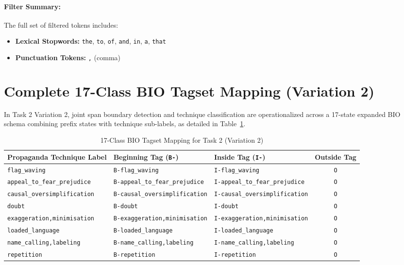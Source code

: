 \documentclass[12pt, a4paper]{article}
\begin{document}
\paragraph{Filter Summary:}
The full set of filtered tokens includes:
\begin{itemize}
    \item \textbf{Lexical Stopwords:} \texttt{the}, \texttt{to}, \texttt{of}, \texttt{and}, \texttt{in}, \texttt{a}, \texttt{that}
    \item \textbf{Punctuation Tokens:} \texttt{,} (comma)
\end{itemize}


\newpage
\section{Complete 17-Class BIO Tagset Mapping (Variation 2)}
\label{app:bio_tagset}

In Task 2 Variation 2, joint span boundary detection and technique classification are operationalized across a 17-state expanded BIO schema combining prefix states with technique sub-labels, as detailed in Table~\ref{tab:bio_tagset}.

\begin{table}[htbp]
  \centering
  \caption{17-Class BIO Tagset Mapping for Task 2 (Variation 2)}
  \label{tab:bio_tagset}
  \scriptsize                      %
  \setlength{\tabcolsep}{3pt}      %
  \begin{tabularx}{\textwidth}{l X X c}
    \toprule
    \textbf{Propaganda Technique Label} & \textbf{Beginning Tag (\texttt{B-})} & \textbf{Inside Tag (\texttt{I-})} & \textbf{Outside Tag} \\
    \midrule
    \texttt{flag\_waving} & \texttt{B-flag\_waving} & \texttt{I-flag\_waving} & \texttt{O} \\
    \addlinespace
    \texttt{appeal\_to\_fear\_prejudice} & \texttt{B-appeal\_to\_fear\_prejudice} & \texttt{I-appeal\_to\_fear\_prejudice} & \texttt{O} \\
    \addlinespace
    \texttt{causal\_oversimplification} & \texttt{B-causal\_oversimplification} & \texttt{I-causal\_oversimplification} & \texttt{O} \\
    \addlinespace
    \texttt{doubt} & \texttt{B-doubt} & \texttt{I-doubt} & \texttt{O} \\
    \addlinespace
    \texttt{exaggeration,minimisation} & \texttt{B-exaggeration,minimisation} & \texttt{I-exaggeration,minimisation} & \texttt{O} \\
    \addlinespace
    \texttt{loaded\_language} & \texttt{B-loaded\_language} & \texttt{I-loaded\_language} & \texttt{O} \\
    \addlinespace
    \texttt{name\_calling,labeling} & \texttt{B-name\_calling,labeling} & \texttt{I-name\_calling,labeling} & \texttt{O} \\
    \addlinespace
    \texttt{repetition} & \texttt{B-repetition} & \texttt{I-repetition} & \texttt{O} \\
    \bottomrule
  \end{tabularx}
\end{table}
\end{document}
